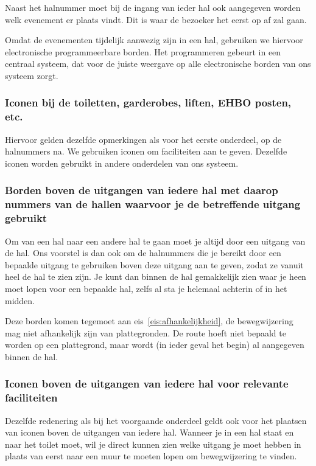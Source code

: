 Naast het halnummer moet bij de ingang van ieder hal ook aangegeven worden welk evenement er plaats vindt. Dit is waar de bezoeker het eerst op af zal gaan.

Omdat de evenementen tijdelijk aanwezig zijn in een hal, gebruiken we hiervoor electronische programmeerbare borden. Het programmeren gebeurt in een centraal systeem, dat voor de juiste weergave op alle electronische borden van ons systeem zorgt.


\subsubsection{Iconen bij de toiletten, garderobes, liften, EHBO posten, etc.}

Hiervoor gelden dezelfde opmerkingen als voor het eerste onderdeel, op de halnummers na. We gebruiken iconen om faciliteiten aan te geven. Dezelfde iconen worden gebruikt in andere onderdelen van ons systeem.


\subsubsection{Borden boven de uitgangen van iedere hal met daarop nummers van de hallen waarvoor je de betreffende uitgang gebruikt}

Om van een hal naar een andere hal te gaan moet je altijd door een uitgang van de hal. Ons voorstel is dan ook om de halnummers die je bereikt door een bepaalde uitgang te gebruiken boven deze uitgang aan te geven, zodat ze vanuit heel de hal te zien zijn. Je kunt dan binnen de hal gemakkelijk zien waar je heen moet lopen voor een bepaalde hal, zelfs al sta je helemaal achterin of in het midden.

Deze borden komen tegemoet aan eis~\ref{eis:afhankelijkheid}, de bewegwijzering mag niet afhankelijk zijn van plattegronden. De route hoeft niet bepaald te worden op een plattegrond, maar wordt (in ieder geval het begin) al aangegeven binnen de hal.


\subsubsection{Iconen boven de uitgangen van iedere hal voor relevante faciliteiten}

Dezelfde redenering als bij het voorgaande onderdeel geldt ook voor het plaatsen van iconen boven de uitgangen van iedere hal. Wanneer je in een hal staat en naar het toilet moet, wil je direct kunnen zien welke uitgang je moet hebben in plaats van eerst naar een muur te moeten lopen om bewegwijzering te vinden.

